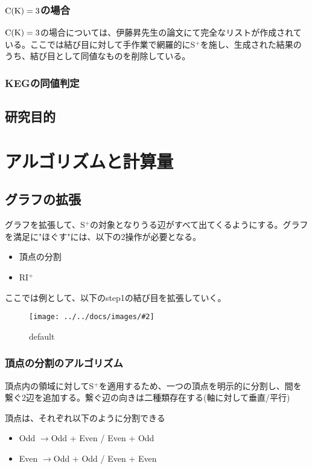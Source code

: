 \documentclass[11pt,a4j]{jarticle}
\newcommand{\splus}{S${}^\text{+}$}
\newcommand{\riplus}{RI${}^\text{+}$}
\newcommand{\f}[1]{$\rm{#1}$} %
\newcommand{\image}[4][height=100pt]{%
\begin{figure}[htbp]
    \centering
    \texttt{[image: ../../docs/images/\#2]}
    \caption{#3}
    \label{fig:#4}
\end{figure}%
}
\newcommand{\ra }{$\rightarrow$}
\begin{document}
\subsubsection{\f{C(K)=3}の場合}
\f{C(K)=3}の場合については、伊藤昇先生の論文\cite{ck3}にて完全なリストが作成されている。ここでは結び目に対して手作業で網羅的に\splus を施し、生成された結果のうち、結び目として同値なものを削除している。

\subsubsection{KEGの同値判定}

\subsection{研究目的}

\section{アルゴリズムと計算量}

\subsection{グラフの拡張}
グラフを拡張して、\splus の対象となりうる辺がすべて出てくるようにする。グラフを満足に"ほぐす"には、以下の2操作が必要となる。
\begin{itemize}
    \item 頂点の分割
    \item \riplus
\end{itemize}

ここでは例として、以下のstep1の結び目を拡張していく。
\image{extend_default.jpg}{default}{default}

\subsubsection{頂点の分割のアルゴリズム}
頂点内の領域に対して\splus を適用するため、一つの頂点を明示的に分割し、間を繋ぐ2辺を追加する。繋ぐ辺の向きは二種類存在する(軸に対して垂直/平行)

頂点は、それぞれ以下のように分割できる
\begin{itemize}
    \item Odd \ra  Odd + Even / Even + Odd
    \item Even \ra  Odd + Odd / Even + Even
\end{itemize}
\end{document}
